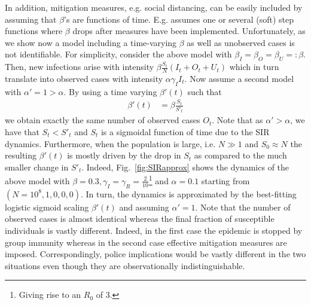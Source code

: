 \documentclass[a4paper]{tufte-handout}
\newcommand{\fig}[1]{Fig.~\ref{fig:#1}}
\begin{document}
In addition, mitigation measures, e.g. social distancing, can be
easily included by assuming that $\beta$'s are functions of
time. E.g. \cite{arxiv:2004.01105} assumes one or several (soft) step
functions where $\beta$ drops after measures have been
implemented. Unfortunately, as we show now a model including a
time-varying $\beta$ as well as unobserved cases is not identifiable.
For simplicity, consider the above model with $\beta_I = \beta_O =
\beta_U =: \beta$. Then, new infections arise with intensity $\beta
\frac{S_t}{N} (I_t + O_t + U_t)$ which in turn translate into observed
cases with intensity $\alpha \gamma_I I_t$. Now assume a second model
with $\alpha' = 1 > \alpha$. By using a time varying $\beta'(t)$
such that
\begin{align*}
  \beta'(t) &= \beta \frac{S_t}{S'_t}
\end{align*}
we obtain exactly the same number of observed cases $O_t$. Note that
as $\alpha' > \alpha$, we have that $S_t < S'_t$ and $S_t$ is a
sigmoidal function of time due to the SIR dynamics. Furthermore, when
the population is large, i.e. $N \gg 1$ and $S_0 \approx N$ the
resulting $\beta'(t)$ is mostly driven by the drop in $S_t$ as
compared to the much smaller change in $S'_t$. Indeed, \fig{SIRapprox}
shows the dynamics of the above model with $\beta = 0.3, \gamma_I =
\gamma_R = \frac{2}{10}$\footnote{Giving rise to an $R_0$ of $3$.} and
$\alpha = 0.1$ starting from $(N = 10^8, 1, 0, 0, 0)$. In turn, the
dynamics is approximated by the best-fitting logistic sigmoid scaling
$\beta'(t)$ and assuming $\alpha' = 1$. Note that the number of
observed cases is almost identical whereas the final fraction of
susceptible individuals is vastly different. Indeed, in the first case
the epidemic is stopped by group immunity whereas in the second case
effective mitigation measures are imposed. Correspondingly, police
implications would be vastly different in the two situations even
though they are observationally indistinguishable.
\end{document}
